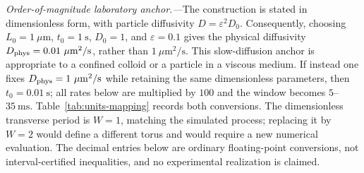 %

\emph{Order-of-magnitude laboratory anchor.---}The construction is stated
in dimensionless form, with particle diffusivity
$D=\varepsilon^2D_0$.  Consequently, choosing
$L_0=1~\mu\mathrm m$, $t_0=1~\mathrm s$, $D_0=1$, and
$\varepsilon=0.1$ gives the physical diffusivity
$D_{\rm phys}=0.01~\mu\mathrm m^2/\mathrm s$, rather than
$1~\mu\mathrm m^2/\mathrm s$.  This slow-diffusion anchor is appropriate
to a confined colloid or a particle in a viscous medium.  If instead one
fixes $D_{\rm phys}=1~\mu\mathrm m^2/\mathrm s$ while retaining the same
dimensionless parameters, then $t_0=0.01~\mathrm s$; all rates below are
multiplied by $100$ and the window becomes $5$--$35~\mathrm{ms}$.
Table~\ref{tab:units-mapping} records both conversions.  The dimensionless
transverse period is $W=1$, matching the simulated process; replacing it
by $W=2$ would define a different torus and would require a new numerical
evaluation.  The decimal entries below are ordinary floating-point
conversions, not interval-certified inequalities, and no experimental
realization is claimed.


